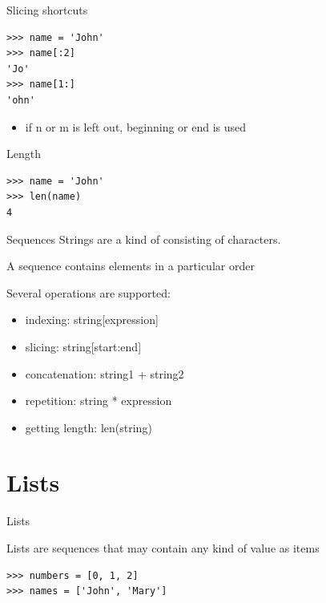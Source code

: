 \documentclass[aspectratio=169,usenames,dvipsnames]{beamer}
\begin{document}
\begin{frame}[fragile]{Slicing shortcuts}
\begin{lstlisting}
>>> name = 'John'
>>> name[:2]
'Jo'
>>> name[1:]
'ohn'
\end{lstlisting}
    \begin{itemize}
        \item if n or m is left out, beginning or end is used
    \end{itemize}
\end{frame}

\begin{frame}[fragile]{Length}
\begin{lstlisting}
>>> name = 'John'
>>> len(name)
4
\end{lstlisting}
\end{frame}

\begin{frame}{Sequences}
    Strings are a kind of 
    consisting of characters.

    A sequence contains elements in a particular order

    Several operations are supported:
    \begin{itemize}
        \item indexing:                    string[expression]
        \item slicing:                     string[start:end]
        \item concatenation:               string1 + string2
        \item repetition:                  string * expression
        \item getting length:              len(string)
    \end{itemize}
\end{frame}


\section{Lists}
\frame{\tableofcontents[currentsection]}

\begin{frame}[fragile]{Lists}
    \begin{definition}
    Lists are sequences that may contain any kind of value as items
    \end{definition}
\begin{lstlisting} 
>>> numbers = [0, 1, 2]
>>> names = ['John', 'Mary']
\end{lstlisting} 
\end{frame}
\end{document}

